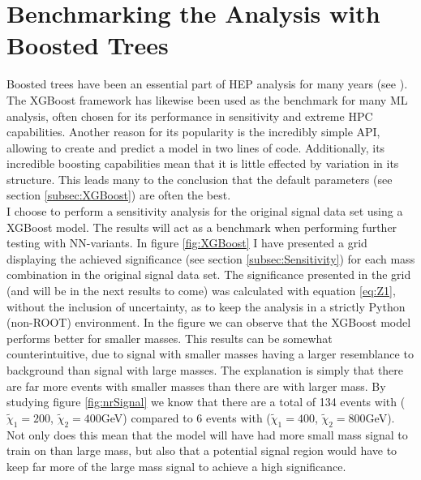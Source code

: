 \section{Benchmarking the Analysis with Boosted Trees}\label{sec:XGBoost}
Boosted trees have been an essential part of \acf{HEP} analysis for many years (see 
\cite{ATLAS-CONF-2011-152,ATLAS-CONF-2017-064}). The XGBoost framework has likewise 
been used as the benchmark for many \ac{ML} analysis, often chosen for its performance in sensitivity and 
extreme \acf{HPC} capabilities. Another reason for its popularity is the incredibly simple \acf{API}, allowing 
to create and predict a model in two lines of code. Additionally, its incredible boosting capabilities mean 
that it is little effected by variation in its structure. This leads many to the conclusion that the default 
parameters (see section \ref{subsec:XGBoost}) are often the best. 
\\
I choose to perform a sensitivity analysis for the original signal data set using a XGBoost model. The results
will act as a benchmark when performing further testing with \ac{NN}-variants. In figure \ref{fig:XGBoost} 
I have presented a grid displaying the achieved significance (see section \ref{subsec:Sensitivity}) for each 
mass combination in the original signal data set. The significance presented in the grid (and will be in the next results to come) 
was calculated with equation \ref{eq:Z1}, without the inclusion of uncertainty, as to keep the analysis in a strictly Python (non-ROOT) 
environment. In the figure we can observe that the XGBoost model performs
better for smaller masses. This results can be somewhat counterintuitive, due to signal with smaller masses 
having a larger resemblance to background than signal with large masses. The explanation is simply that there are
far more events with smaller masses than there are with larger mass. By studying figure \ref{fig:nrSignal} we know that 
there are a total of 134 events with ($\tilde{\chi}_1=200$, $\tilde{\chi}_2=400$GeV) compared to 6 events 
with ($\tilde{\chi}_1=400$, $\tilde{\chi}_2=800$GeV). Not only does this mean that the model will have had 
more small mass signal to train on than large mass, but also that a potential signal region would have to keep 
far more of the large mass signal to achieve a high significance.\\
